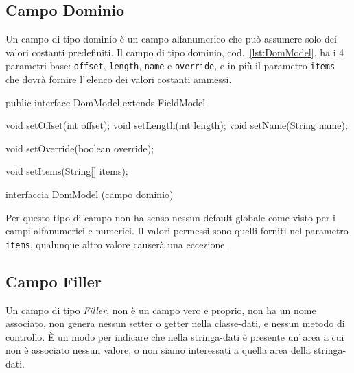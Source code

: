 \documentclass[a4paper,10pt]{report}
\newif\ifesource
\newenvironment{elisting}[1][!htb]
  {\captionsetup{aboveskip=0pt}\begin{listing}[#1]}
  {\end{listing}%
}
\begin{document}
\subsection{Campo Dominio}
Un campo di tipo dominio è un campo alfanumerico che può assumere solo dei 
valori costanti predefiniti.
Il campo di tipo dominio, cod.~\ref{lst:DomModel}, ha i 4 parametri base: 
\verb!offset!, \verb!length!, \verb!name! e \verb!override!, e in più il 
parametro \verb!items! che dovrà fornire l'\,elenco dei valori costanti ammessi.

\ifesource
\begin{figure*}[!htb]
\begin{lstlisting}[language=java, 
caption=interfaccia DomModel (campo dominio), 
label=lst:DomModel]
public interface DomModel extends FieldModel {
    void setOffset(int offset);
    void setLength(int length);
    void setName(String name);
    
    void setOverride(boolean override);
    
    void setItems(String[] items);
}
\end{lstlisting}\index{DomModel}
\end{figure*}
\else
\begin{elisting}
\begin{javacode}
public interface DomModel extends FieldModel {
    void setOffset(int offset);
    void setLength(int length);
    void setName(String name);
    
    void setOverride(boolean override);
    
    void setItems(String[] items);
}
\end{javacode}
\caption{interfaccia DomModel (campo dominio)}
\label{lst:DomModel}
\end{elisting}
\fi

Per questo tipo di campo non ha senso nessun default globale come visto per i
campi alfanumerici e numerici. Il valori permessi sono quelli forniti nel 
parametro \verb!items!, qualunque altro valore causerà una eccezione.

\subsection{Campo Filler}
Un campo di tipo \textsl{Filler}, non è un campo vero e proprio, non ha un nome 
associato, non genera nessun setter o getter nella classe-dati, e nessun metodo
di controllo. È un modo per indicare che nella stringa-dati è presente un'\,area
a cui non è associato nessun valore, o non siamo interessati a quella area della
stringa-dati.
\end{document}
